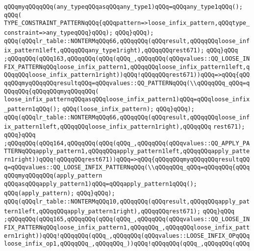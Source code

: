 \verb|qQQqmyqQQqqQQq(any_typeqQQqasqQQqany_type1)qQQq=qQQqany_type1qQQq();|\newline
\verb|qQQq(|\newline
\verb|TYPE_CONSTRAINT_PATTERNqQQq{qQQqpattern=>loose_infix_pattern,qQQqtype_constraint=>any_typeqQQq}qQQq);|\newline
\verb|qQQq}qQQq);|\newline
\verb|qQQq(qQQqlr_table::NONTERMqQQq66,qQQqqQQq(qQQqresult,qQQqqQQqloose_infix_pattern1left,qQQqqQQqany_type1right),qQQqqQQqrest671);|\newline
\verb|qQQq}qQQq|\newline
\verb|;qQQqqQQq(qQQq163,qQQqqQQq(qQQq(qQQq_,qQQqqQQq(qQQqvalues::QQ_LOOSE_INFIX_PATTERNqQQqloose_infix_pattern1,qQQqqQQqloose_infix_pattern1left,qQQqqQQqloose_infix_pattern1right))qQQq!qQQqqQQqrest671))qQQq=>qQQq{qQQqqQQqmyqQQqqQQqresultqQQq=qQQqvalues::QQ_PATTERNqQQq(\\qQQqqQQq_qQQq=qQQqqQQq{qQQqqQQqmyqQQqqQQq(|\newline
\verb|loose_infix_patternqQQqasqQQqloose_infix_pattern1)qQQq=qQQqloose_infix_pattern1qQQq();|\newline
\verb|qQQq(loose_infix_pattern);|\newline
\verb|qQQq}qQQq);|\newline
\verb|qQQq(qQQqlr_table::NONTERMqQQq66,qQQqqQQq(qQQqresult,qQQqqQQqloose_infix_pattern1left,qQQqqQQqloose_infix_pattern1right),qQQqqQQq|\newline
\verb|rest671);|\newline
\verb|qQQq}qQQq|\newline
\verb|;qQQqqQQq(qQQq164,qQQqqQQq(qQQq(qQQq_,qQQqqQQq(qQQqvalues::QQ_APPLY_PATTERNqQQqapply_pattern1,qQQqqQQqapply_pattern1left,qQQqqQQqapply_pattern1right))qQQq!qQQqqQQqrest671))qQQq=>qQQq{qQQqqQQqmyqQQqqQQqresultqQQq=qQQqvalues::QQ_LOOSE_INFIX_PATTERNqQQq(\\qQQqqQQq_qQQq=qQQqqQQq{qQQqqQQqmyqQQqqQQq(apply_pattern|\newline
\verb|qQQqasqQQqapply_pattern1)qQQq=qQQqapply_pattern1qQQq();|\newline
\verb|qQQq(apply_pattern);|\newline
\verb|qQQq}qQQq);|\newline
\verb|qQQq(qQQqlr_table::NONTERMqQQq10,qQQqqQQq(qQQqresult,qQQqqQQqapply_pattern1left,qQQqqQQqapply_pattern1right),qQQqqQQqrest671);|\newline
\verb|qQQq}qQQq|\newline
\verb|;qQQqqQQq(qQQq165,qQQqqQQq(qQQq(qQQq_,qQQqqQQq(qQQqvalues::QQ_LOOSE_INFIX_PATTERNqQQqloose_infix_pattern1,qQQqqQQq_,qQQqqQQqloose_infix_pattern1right))qQQq!qQQqqQQq(qQQq_,qQQqqQQq(qQQqvalues::LOOSE_INFIX_OPqQQqloose_infix_op1,qQQqqQQq_,qQQqqQQq_))qQQq!qQQqqQQq(qQQq_,qQQqqQQq(qQQq|\newline
